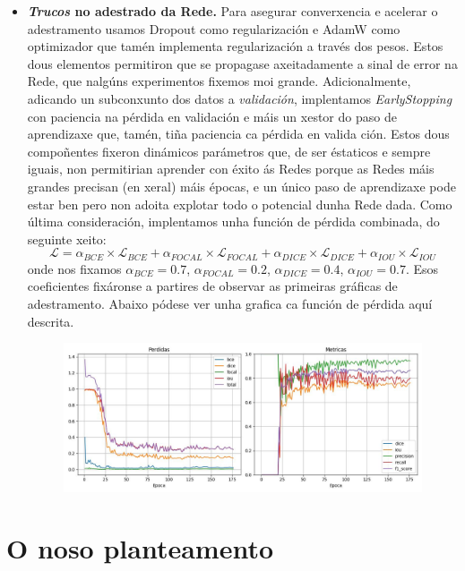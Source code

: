 \documentclass{article}
\begin{document}
\begin{itemize}
\item \textbf{\emph{Trucos} no adestrado da Rede.} Para asegurar converxencia e acelerar o adestramento usamos Dropout \cite{srivastava2014dropout} como regularización e AdamW \cite{loshchilov2019decoupled} como optimizador que tamén implementa regularización a través dos pesos. Estos dous elementos permitiron que se propagase axeitadamente a sinal de error na Rede, que nalgúns experimentos fixemos moi grande. Adicionalmente, adicando un subconxunto dos datos a \emph{validación}, implentamos \emph{EarlyStopping} con paciencia na pérdida en validación e máis un xestor do paso de aprendizaxe que, tamén, tiña paciencia ca pérdida en valida ción. Estos dous compoñentes fixeron dinámicos parámetros que, de ser éstaticos e sempre iguais, non permitirian aprender con éxito ás Redes porque as Redes máis grandes precisan (en xeral) máis épocas, e un único paso de aprendizaxe pode estar ben pero non adoita explotar todo o potencial dunha Rede dada. Como última consideración, implentamos unha función de pérdida combinada, do seguinte xeito: \[\mathcal{L} = \alpha_{BCE} \times \mathcal{L}_{BCE} + \alpha_{FOCAL} \times \mathcal{L}_{FOCAL} + \alpha_{DICE} \times \mathcal{L}_{DICE} + \alpha_{IOU} \times \mathcal{L}_{IOU}\] onde nos fixamos $\alpha_{BCE} = 0.7$, $\alpha_{FOCAL} = 0.2$, $\alpha_{DICE} = 0.4$, $\alpha_{IOU} = 0.7$. Esos coeficientes fixáronse a partires de observar as primeiras gráficas de adestramento. Abaixo pódese ver unha grafica ca función de pérdida aquí descrita. 

\begin{figure}[H]
	\centering
	\includegraphics[width=\linewidth]{figuras/CU_adTrue_batch10_proc7_canles32_prof4_lr0.001_factocurva_perdida.jpg}
	\label{fig:perdida_funcion}
\end{figure}

\end{itemize}

\section{O noso planteamento}
\end{document}
